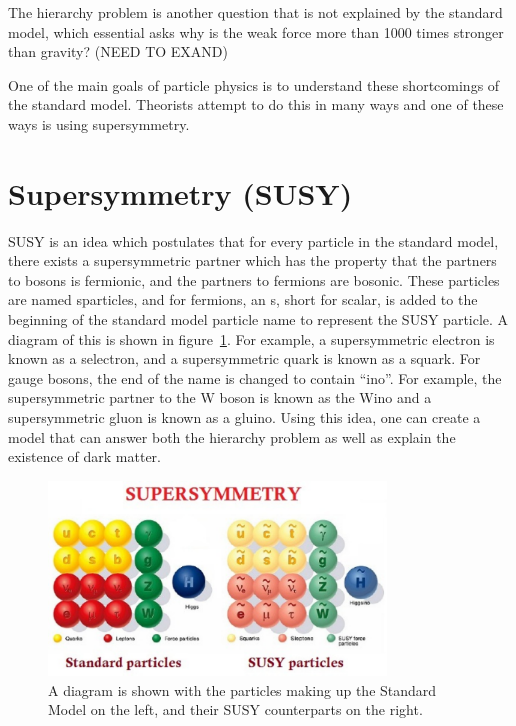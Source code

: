 The hierarchy problem is another question that is not explained by the standard model,
which essential asks why is the weak force more than 1000 times stronger than gravity?
(NEED TO EXAND)


One of the main goals of particle physics is to understand these shortcomings of the standard model.
Theorists attempt to do this in many ways and one of these ways is using supersymmetry.

\section{Supersymmetry (SUSY)}
SUSY is an idea which postulates that for every particle in the standard model,
there exists a supersymmetric partner which has the property that the partners to bosons is fermionic, and the partners to fermions are bosonic.
These particles are named sparticles, and for fermions, an s, short for scalar, is added to the beginning of the standard model particle name to represent the SUSY particle.
A diagram of this is shown in figure~\ref{fig:SM_SUSY}.
For example, a supersymmetric electron is known as a selectron, and a supersymmetric quark is known as a squark.
For gauge bosons, the end of the name is changed to contain ``ino''.
For example, the supersymmetric partner to the W boson is known as the Wino and a supersymmetric gluon is known as a gluino.
Using this idea, one can create a model that can answer both the hierarchy problem as well as explain the existence of dark matter.

\begin{figure}[!htb]
  \begin{center}
    \includegraphics[width=0.8\textwidth]{intro/figs/Susy-particles.pdf}
    \caption{
      \label{fig:SM_SUSY}
      A diagram is shown with the particles making up the Standard Model on the left, and their SUSY counterparts on the right.
    }
  \end{center}
\end{figure}

